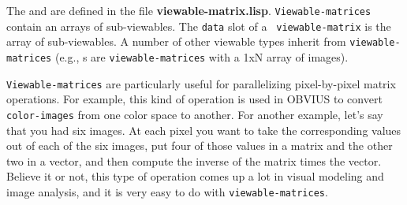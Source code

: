 The  and  are defined in the
file {\bf viewable-matrix.lisp}.  {\tt Viewable-matrices} contain an
arrays of sub-viewables.  The {\tt data} slot of a {\tt
viewable-matrix} is the array of sub-viewables.  A number of other
viewable types inherit from {\tt viewable-matrices} (e.g.,
s are {\tt viewable-matrices} with a 1xN array of
images).

{\tt Viewable-matrices} are particularly useful for parallelizing
pixel-by-pixel matrix operations.  For example, this kind of operation
is used in OBVIUS to convert {\tt color-images} from one color space
to another.  For another example, let's say that you had six images.
At each pixel you want to take the corresponding values out of each of
the six images, put four of those values in a matrix and the other two
in a vector, and then compute the inverse of the matrix times the
vector.  Believe it or not, this type of operation comes up a lot in
visual modeling and image analysis, and it is very easy to do with
{\tt viewable-matrices}.


